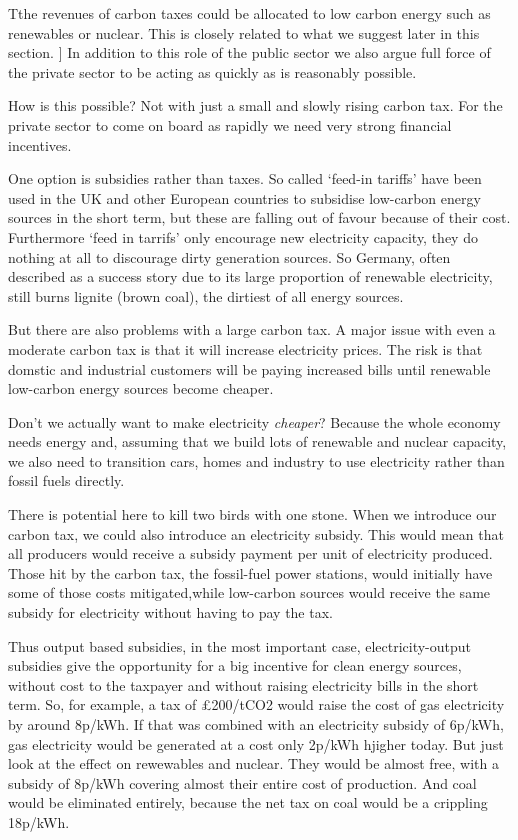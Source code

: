 \documentclass[]{tufte-handout}
\begin{document}
Tthe revenues of carbon taxes could be allocated to low carbon energy
such as renewables or nuclear. This is closely related to what we
suggest later in this section. {]} In addition to this role of the
public sector we also argue full force of the private sector to be
acting as quickly as is reasonably possible.

How is this possible? Not with just a small and slowly rising carbon
tax. For the private sector to come on board as rapidly we need very
strong financial incentives.

One option is subsidies rather than taxes. So called `feed-in tariffs'
have been used in the UK and other European countries to subsidise
low-carbon energy sources in the short term, but these are falling out
of favour because of their cost. Furthermore `feed in tarrifs' only
encourage new electricity capacity, they do nothing at all to discourage
dirty generation sources. So Germany, often described as a success story
due to its large proportion of renewable electricity, still burns
lignite (brown coal), the dirtiest of all energy sources.

But there are also problems with a large carbon tax. A major issue with
even a moderate carbon tax is that it will increase electricity prices.
The risk is that domstic and industrial customers will be paying
increased bills until renewable low-carbon energy sources become
cheaper.

Don't we actually want to make electricity \emph{cheaper}? Because the
whole economy needs energy and, assuming that we build lots of renewable
and nuclear capacity, we also need to transition cars, homes and
industry to use electricity rather than fossil fuels directly.

There is potential here to kill two birds with one stone. When we
introduce our carbon tax, we could also introduce an electricity
subsidy. This would mean that all producers would receive a subsidy
payment per unit of electricity produced. Those hit by the carbon tax,
the fossil-fuel power stations, would initially have some of those costs
mitigated,while low-carbon sources would receive the same subsidy for
electricity without having to pay the tax.

Thus output based subsidies, in the most important case,
electricity-output subsidies give the opportunity for a big incentive
for clean energy sources, without cost to the taxpayer and without
raising electricity bills in the short term. So, for example, a tax of
£200/tCO2 would raise the cost of gas electricity by around 8p/kWh. If
that was combined with an electricity subsidy of 6p/kWh, gas electricity
would be generated at a cost only 2p/kWh hjigher today. But just look at
the effect on rewewables and nuclear. They would be almost free, with a
subsidy of 8p/kWh covering almost their entire cost of production. And
coal would be eliminated entirely, because the net tax on coal would be
a crippling 18p/kWh.
\end{document}
